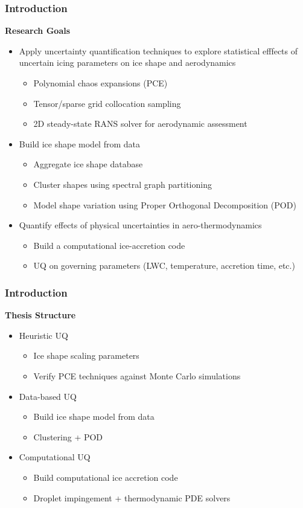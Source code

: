 \documentclass[9pt]{beamer}
\begin{document}
\begin{frame}
\frametitle{Introduction}
\label{sec-1-4}

\textbf{Research Goals}
\begin{itemize}
\item Apply uncertainty quantification techniques to explore statistical
  efffects of uncertain icing parameters on ice shape and aerodynamics
\begin{itemize}
\item Polynomial chaos expansions (PCE)
\item Tensor/sparse grid collocation sampling
\item 2D steady-state RANS solver for aerodynamic assessment
\end{itemize}
\item Build ice shape model from data
\begin{itemize}
\item Aggregate ice shape database
\item Cluster shapes using spectral graph partitioning
\item Model shape variation using Proper Orthogonal Decomposition (POD)
\end{itemize}
\item Quantify effects of physical uncertainties in aero-thermodynamics
\begin{itemize}
\item Build a computational ice-accretion code
\item UQ on governing parameters (LWC, temperature, accretion time, etc.)
\end{itemize}
\end{itemize}
\end{frame}
\begin{frame}
\frametitle{Introduction}
\label{sec-1-5}

\textbf{Thesis Structure}
\begin{itemize}
\item Heuristic UQ
\begin{itemize}
\item Ice shape scaling parameters
\item Verify PCE techniques against Monte Carlo simulations
\end{itemize}
\item Data-based UQ
\begin{itemize}
\item Build ice shape model from data
\item Clustering + POD
\end{itemize}
\item Computational UQ
\begin{itemize}
\item Build computational ice accretion code
\item Droplet impingement + thermodynamic PDE solvers
\end{itemize}
\end{itemize}
\end{frame}
\end{document}
